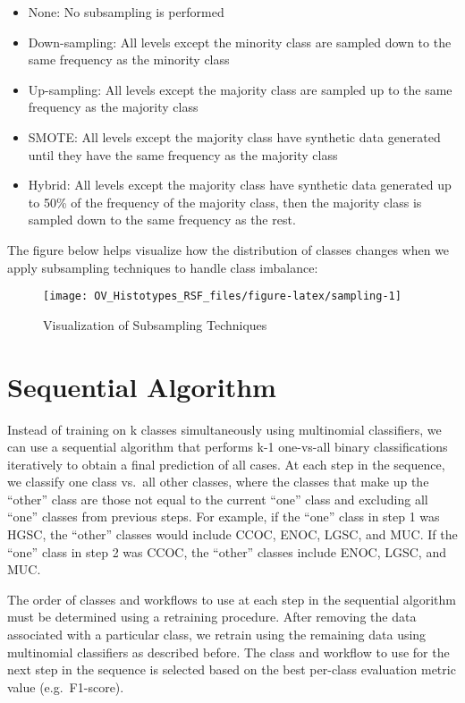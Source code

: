 \documentclass[
]{report}
\providecommand{\tightlist}{%
  \setlength{\itemsep}{0pt}\setlength{\parskip}{0pt}}
\begin{document}
\begin{itemize}
\tightlist
\item
  None: No subsampling is performed
\item
  Down-sampling: All levels except the minority class are sampled down to the same frequency as the minority class
\item
  Up-sampling: All levels except the majority class are sampled up to the same frequency as the majority class
\item
  SMOTE: All levels except the majority class have synthetic data generated until they have the same frequency as the majority class
\item
  Hybrid: All levels except the majority class have synthetic data generated up to 50\% of the frequency of the majority class, then the majority class is sampled down to the same frequency as the rest.
\end{itemize}

The figure below helps visualize how the distribution of classes changes when we apply subsampling techniques to handle class imbalance:

\begin{figure}[H]

{\centering \texttt{[image: OV\_Histotypes\_RSF\_files/figure-latex/sampling-1]} 

}

\caption{Visualization of Subsampling Techniques}\label{fig:sampling}
\end{figure}

\hypertarget{sequential-algorithm}{%
\section{Sequential Algorithm}\label{sequential-algorithm}}

Instead of training on k classes simultaneously using multinomial classifiers, we can use a sequential algorithm that performs k-1 one-vs-all binary classifications iteratively to obtain a final prediction of all cases. At each step in the sequence, we classify one class vs.~all other classes, where the classes that make up the ``other'' class are those not equal to the current ``one'' class and excluding all ``one'' classes from previous steps. For example, if the ``one'' class in step 1 was HGSC, the ``other'' classes would include CCOC, ENOC, LGSC, and MUC. If the ``one'' class in step 2 was CCOC, the ``other'' classes include ENOC, LGSC, and MUC.

The order of classes and workflows to use at each step in the sequential algorithm must be determined using a retraining procedure. After removing the data associated with a particular class, we retrain using the remaining data using multinomial classifiers as described before. The class and workflow to use for the next step in the sequence is selected based on the best per-class evaluation metric value (e.g.~F1-score).
\end{document}
